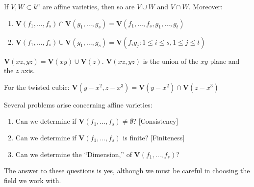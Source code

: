                 \begin{theorem}
                    If $V,W\subset k^n$ are affine varieties,
                    then so are $V\cup W$ and $V\cap W$. Moreover:
                    \begin{enumerate}
                        \item $\mathbf{V}(f_{1},\hdots,f_{s})%
                               \cap\mathbf{V}(g_{1},\hdots,g_{s})%
                               =\mathbf{V}(f_{1},%
                               \hdots,f_{s},g_{1},%
                               \hdots,g_{t})$
                        \item $\mathbf{V}(f_{1},\hdots,f_{s})%
                               \cup\mathbf{V}(g_{1},\hdots,g_{s})%
                               =\mathbf{V}(%
                               f_{i}g_{j}:1\leq i\leq s,1\leq j\leq t)$
                    \end{enumerate}
                \end{theorem}
                \begin{example}
                    $\mathbf{V}(xz,yz)%
                     =\mathbf{V}(xy)\cup\mathbf{V}(z)$.
                    $\mathbf{V}(xz,yz)$ is the union
                    of the $xy$ plane
                    and the $z$ axis.
                \end{example}
                \begin{example}
                    For the twisted cubic:
                    $\mathbf{V}(y-x^{2},z-x^{3})%
                     =\mathbf{V}(y-x^{2})\cap\mathbf{V}(z-x^{3})$
                \end{example}
                Several problems arise concerning affine varieties:
                \begin{enumerate}
                    \item Can we determine if
                          $\mathbf{V}(f_{1},\hdots,f_{s})\ne\emptyset$?
                          \hfill[Consistency]
                    \item Can we determine if
                          $\mathbf{V}(f_{1},\hdots,f_{s})$ is finite?
                          \hfill[Finiteness]
                    \item Can we determine the ``Dimension,'' of
                          $\mathbf{V}(f_{1},\hdots,f_{s})$?
                \end{enumerate}
                The answer to these questions is yes,
                although we must be careful in choosing
                the field we work with. 
